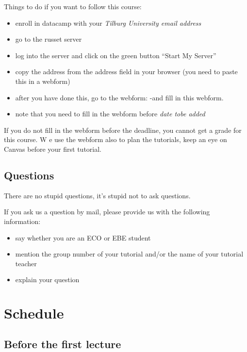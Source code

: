 \documentclass[]{book}
\providecommand{\tightlist}{%
  \setlength{\itemsep}{0pt}\setlength{\parskip}{0pt}}
\begin{document}
Things to do if you want to follow this course:

\begin{itemize}
\tightlist
\item
  enroll in datacamp with your \emph{Tilburg University email address}
\item
  go to the russet server
\item
  log into the server and click on the green button ``Start My Server''
\item
  copy the address from the address field in your browser (you need to paste this in a webform)
\item
  after you have done this, go to the webform:
  -and fill in this webform.
\item
  note that you need to fill in the webform before \emph{date tobe added}
\end{itemize}

If you do not fill in the webform before the deadline, you cannot get a grade for this course.
W e use the webform also to plan the tutorials, keep an eye on Canvas before your first tutorial.

\hypertarget{questions}{%
\section{Questions}\label{questions}}

There are no stupid questions, it's stupid not to ask questions.

If you ask us a question by mail, please provide us with the following information:

\begin{itemize}
\tightlist
\item
  say whether you are an ECO or EBE student
\item
  mention the group number of your tutorial and/or the name of your tutorial teacher
\item
  explain your question
\end{itemize}

\hypertarget{schedule}{%
\chapter{Schedule}\label{schedule}}

\hypertarget{before-the-first-lecture}{%
\section{Before the first lecture}\label{before-the-first-lecture}}
\end{document}
